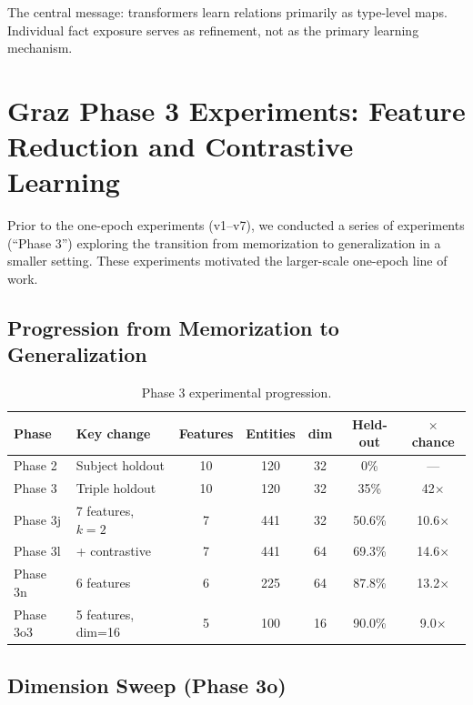 \documentclass[11pt]{article}
\begin{document}
The central message: transformers learn relations primarily as type-level maps.
Individual fact exposure serves as refinement, not as the primary learning mechanism.

\appendix

\section{Graz Phase 3 Experiments: Feature Reduction and Contrastive Learning}
\label{app:progression}

Prior to the one-epoch experiments (v1--v7), we conducted a series of experiments
(``Phase 3'') exploring the transition from memorization to generalization in a
smaller setting.  These experiments motivated the larger-scale one-epoch line of work.

\subsection{Progression from Memorization to Generalization}

\begin{table}[h]
\centering
\caption{Phase 3 experimental progression.}
\begin{tabular}{llccccc}
\toprule
Phase & Key change & Features & Entities & dim & Held-out & $\times$ chance \\
\midrule
Phase 2 & Subject holdout & 10 & 120 & 32 & 0\% & --- \\
Phase 3 & Triple holdout & 10 & 120 & 32 & 35\% & 42$\times$ \\
Phase 3j & 7 features, $k{=}2$ & 7 & 441 & 32 & 50.6\% & 10.6$\times$ \\
Phase 3l & + contrastive & 7 & 441 & 64 & 69.3\% & 14.6$\times$ \\
Phase 3n & 6 features & 6 & 225 & 64 & 87.8\% & 13.2$\times$ \\
Phase 3o3 & 5 features, dim=16 & 5 & 100 & 16 & 90.0\% & 9.0$\times$ \\
\bottomrule
\end{tabular}
\end{table}

\subsection{Dimension Sweep (Phase 3o)}
\end{document}
